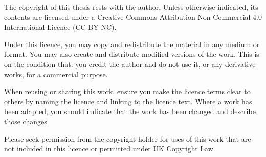 The copyright of this thesis rests with the author.
Unless otherwise indicated, its contents are licensed under a Creative Commons Attribution Non-Commercial 4.0 International Licence (CC BY-NC).

Under this licence, you may copy and redistribute the material in any medium or format.
You may also create and distribute modified versions of the work.
This is on the condition that: you credit the author and do not use it, or any derivative works, for a commercial purpose.

When reusing or sharing this work, ensure you make the licence terms clear to others by naming the licence and linking to the licence text.
Where a work has been adapted, you should indicate that the work has been changed and describe those changes.

Please seek permission from the copyright holder for uses of this work that are not included in this licence or permitted under UK Copyright Law.
